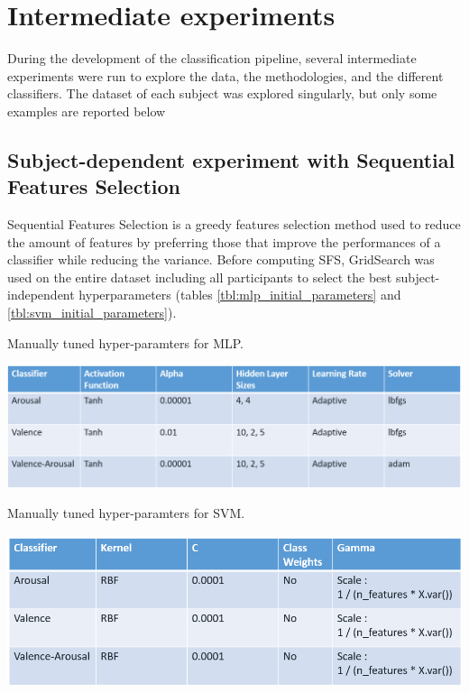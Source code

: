 \section{Intermediate experiments}
\label{sec:appendix_A3}
During the development of the classification pipeline, several intermediate experiments were run to
explore the data, the methodologies, and the different classifiers. The dataset of each subject was 
explored singularly, but only some examples are reported below

\subsection{Subject-dependent experiment with Sequential Features Selection}
\label{sec:appendix_A3.1}
Sequential Features Selection is a greedy features selection method used to reduce the amount of features by preferring those that improve the performances of a classifier while reducing the variance. Before computing \ac{SFS}, GridSearch was used on the entire dataset including all participants to select the best subject-independent hyperparameters (tables \ref{tbl:mlp_initial_parameters} and \ref{tbl:svm_initial_parameters}). 
\begin{table}[h!]
  \caption{Manually tuned hyper-paramters for MLP.}
  \label{tbl:mlp_initial_parameters}
  \includegraphics[width=\linewidth]{img/appendix/mlp_initial_parameters.png}
\end{table}

\begin{table}[h!]
  \caption{Manually tuned hyper-paramters for SVM.}
  \label{tbl:svm_initial_parameters}
  \includegraphics[width=\linewidth]{img/appendix/svm_initial_parameters.png}
\end{table}

